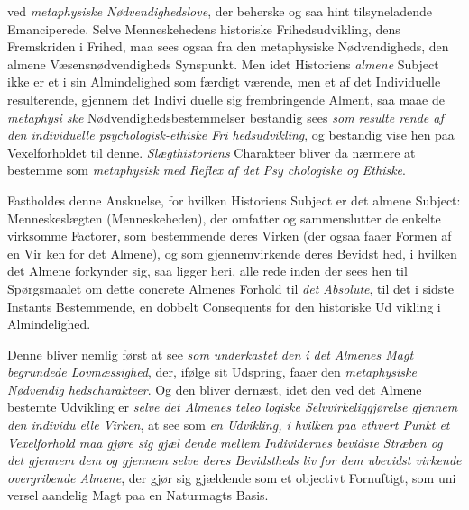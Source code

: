 ved \emph{metaphysiske Nødvendighedslove}, der beherske og\-%
saa hint tilsyneladende Emanciperede. Selve Menneskehedens
historiske Frihedsudvikling, dens Fremskriden i Frihed, maa
sees ogsaa fra den metaphysiske Nødvendigheds, den almene
Væsensnødvendigheds Synspunkt. Men idet Historiens \emph{almene}
Subject ikke er et i sin Almindelighed som færdigt værende,
men et af det Individuelle resulterende, gjennem det Indivi\-%
duelle sig frembringende Alment, saa maae de \emph{metaphysi\-%
ske} Nødvendighedsbestemmelser bestandig sees \emph{som resulte\-%
rende af den individuelle psychologisk-ethiske Fri\-%
hedsudvikling}, og bestandig vise hen paa Vexelforholdet
til denne. \emph{Slægthistoriens} Charakteer bliver da nærmere
at bestemme som \emph{metaphysisk med Reflex af det Psy\-%
chologiske og Ethiske}.

Fastholdes denne Anskuelse, for hvilken Historiens Subject
er det almene Subject: Menneskeslægten (Menneskeheden), der
omfatter og sammenslutter de enkelte virksomme Factorer, som
bestemmende deres Virken (der ogsaa faaer Formen af en Vir\-%
ken for det Almene), og som gjennemvirkende deres Bevidst\-%
hed, i hvilken det Almene forkynder sig, saa ligger heri, alle\-%
rede inden der sees hen til Spørgsmaalet om dette concrete
Almenes Forhold til \emph{det Absolute}, til det i sidste Instants
Bestemmende, en dobbelt Consequents for den historiske Ud\-%
vikling i Almindelighed.

 Denne bliver nemlig først at see \emph{som underkastet den
i det Almenes Magt begrundede Lovmæssighed}, der,
ifølge sit Udspring, faaer den \emph{metaphysiske Nødvendig\-%
hedscharakteer}. Og den bliver dernæst, idet den ved det
Almene bestemte Udvikling er \emph{selve det Almenes teleo\-%
logiske Selvvirkeliggjørelse gjennem den individu\-%
elle Virken}, at see som \emph{en Udvikling, i hvilken paa
ethvert Punkt et Vexelforhold maa gjøre sig gjæl\-%
dende mellem Individernes bevidste Stræben og det
gjennem dem og gjennem selve deres Bevidstheds\-%
liv for dem ubevidst virkende overgribende Almene},
der gjør sig gjældende som et objectivt Fornuftigt, som uni\-%
versel aandelig Magt paa en Naturmagts Basis.

